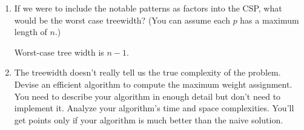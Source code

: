 \documentclass[10pt]{article}
\begin{document}
\begin{enumerate}[label=(\alph*)]

  \item If we were to include the notable patterns as factors into the CSP, what would be the worst case treewidth? (You can assume each $p$ has a maximum length of $n$.)
  
  \begin{center}
	\end{center}
	
	Worst-case tree width is $n - 1$.
  
  \item The treewidth doesn't really tell us the true complexity of the problem. Devise an efficient algorithm to compute the maximum weight assignment. You need to describe your algorithm in enough detail but don't need to implement it. Analyze your algorithm's time and space complexities. You'll get points only if your algorithm is much better than the naive solution.
		
\end{enumerate}
\end{document}
